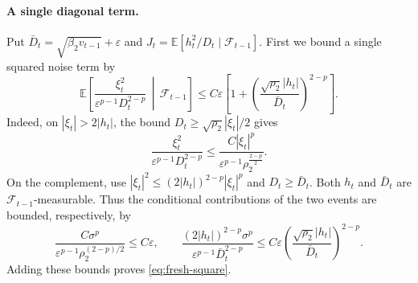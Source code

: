 \documentclass[11pt,letterpaper]{article}
\theoremstyle{definition}
\newcommand{\E}{\mathbb E}
\newcommand{\F}{\mathcal F}
\newcommand{\eps}{\varepsilon}
\begin{document}
\paragraph{A single diagonal term.}
Put $\bar D_t=\sqrt{\beta_2v_{t-1}}+\eps$ and
$J_t=\E[h_t^2/D_t\mid\F_{t-1}]$.
First we bound a single squared noise term by
\begin{equation}
\E\left[\frac{\xi_t^2}{\eps^{p-1}D_t^{2-p}}
\,\middle|\,\F_{t-1}\right]
\le C\eps\left[1+
\left(\frac{\sqrt{\rho_2}|h_t|}{\bar D_t}\right)^{2-p}\right].
\label{eq:fresh-square}
\end{equation}
Indeed, on $|\xi_t|>2|h_t|$, the bound
$D_t\ge\sqrt{\rho_2}|\xi_t|/2$ gives
\[
\frac{\xi_t^2}{\eps^{p-1}D_t^{2-p}}
\le\frac{C|\xi_t|^p}{\eps^{p-1}\rho_2^{\frac{2-p}{2}}}.
\]
On the complement, use
$|\xi_t|^2\le(2|h_t|)^{2-p}|\xi_t|^p$ and $D_t\ge \bar D_t$.
Both $h_t$ and $\bar D_t$ are $\F_{t-1}$-measurable. Thus the conditional
contributions of the two events are bounded, respectively, by
\[
\frac{C\sigma^p}{\eps^{p-1}\rho_2^{(2-p)/2}}\le C\eps,
\qquad
\frac{(2|h_t|)^{2-p}\sigma^p}{\eps^{p-1}\bar D_t^{2-p}}
\le C\eps\left(\frac{\sqrt{\rho_2}|h_t|}{\bar D_t}\right)^{2-p}.
\]
Adding these bounds proves \eqref{eq:fresh-square}.
\end{document}

